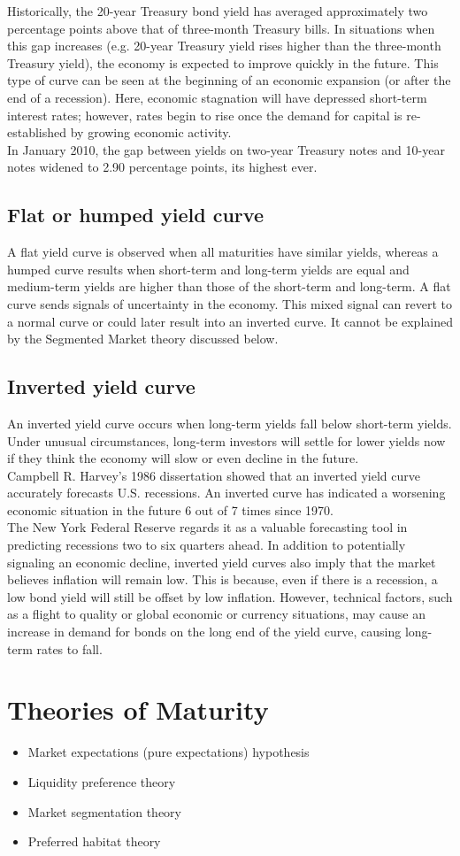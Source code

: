 \documentclass[12pt, a4paper]{report}
\begin{document}
Historically, the 20-year Treasury bond yield has averaged
approximately two percentage points above that of three-month
Treasury bills. In situations when this gap increases (e.g.
20-year Treasury yield rises higher than the three-month Treasury
yield), the economy is expected to improve quickly in the future.
This type of curve can be seen at the beginning of an economic
expansion (or after the end of a recession). Here, economic
stagnation will have depressed short-term interest rates; however,
rates begin to rise once the demand for capital is re-established
by growing economic activity. \\In January 2010, the gap between
yields on two-year Treasury notes and 10-year notes widened to
2.90 percentage points, its highest ever. \subsection{Flat or
humped yield curve} A flat yield curve is observed when all
maturities have similar yields, whereas a humped curve results
when short-term and long-term yields are equal and medium-term
yields are higher than those of the short-term and long-term. A
flat curve sends signals of uncertainty in the economy. This mixed
signal can revert to a normal curve or could later result into an
inverted curve. It cannot be explained by the Segmented Market
theory discussed below. \subsection{Inverted yield curve} An
inverted yield curve occurs when long-term yields fall below
short-term yields. Under unusual circumstances, long-term
investors will settle for lower yields now if they think the
economy will slow or even decline in the future. \\Campbell R.
Harvey's 1986 dissertation showed that an inverted yield curve
accurately forecasts U.S. recessions. An inverted curve has
indicated a worsening economic situation in the future 6 out of 7
times since 1970.\\ The New York Federal Reserve regards it as a
valuable forecasting tool in predicting recessions two to six
quarters ahead. In addition to potentially signaling an economic
decline, inverted yield curves also imply that the market believes
inflation will remain low. This is because, even if there is a
recession, a low bond yield will still be offset by low inflation.
However, technical factors, such as a flight to quality or global
economic or currency situations, may cause an increase in demand
for bonds on the long end of the yield curve, causing long-term
rates to fall.

\section{Theories of Maturity}
\begin{itemize}
\item Market expectations (pure expectations) hypothesis \item
Liquidity preference theory \item Market segmentation theory \item
Preferred habitat theory
\end{itemize}
\end{document}
